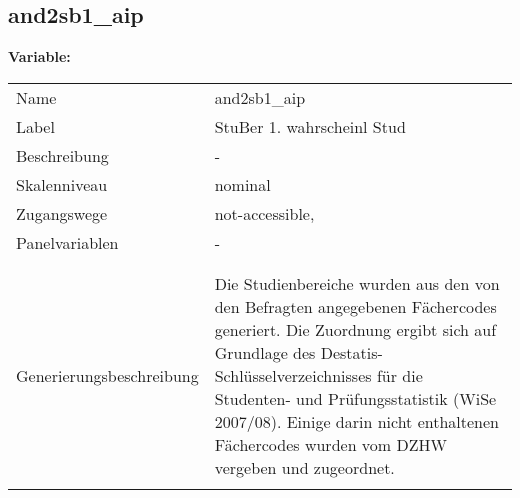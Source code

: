 	
	
	\subsection{and2sb1\_aip}
	\label{subSection:and2sb1_aip}

	\noindent\textbf{Variable:}\\
		\begin{tabular}{lL{11.3cm}}
			\label{tableVariable:and2sb1_aip}
			Name & and2sb1\_aip \\
			Label & StuBer 1. wahrscheinl Stud \\
			Beschreibung & - \\
			Skalenniveau & nominal \\
			Zugangswege &
				not-accessible,
 \\
			Panelvariablen & -
			 \\
			 \\
 \\
					Generierungsbeschreibung & Die Studienbereiche wurden aus den von den Befragten angegebenen Fächercodes generiert. Die Zuordnung ergibt sich auf Grundlage des Destatis-Schlüsselverzeichnisses für die Studenten- und Prüfungsstatistik (WiSe 2007/08). Einige darin nicht enthaltenen Fächercodes wurden vom DZHW vergeben und zugeordnet. 
				 \\	
			 \\
		\end{tabular}






	
	\newpage
